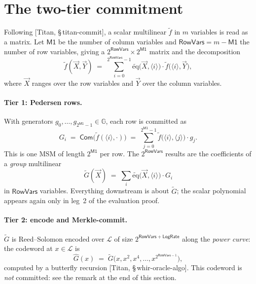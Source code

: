 \documentclass[11pt,a4paper]{article}
\newcommand{\G}{\mathbb{G}}
\newcommand{\dom}{\mathcal{L}}
\newcommand{\bin}[1]{\langle #1 \rangle}
\newcommand{\eq}{\widetilde{\mathrm{eq}}}
\newcommand{\Com}{\mathsf{Com}}
\newcommand{\paper}[1]{\textsf{[Titan, #1]}}
\theoremstyle{definition}
\begin{document}
\section{The two-tier commitment}
\label{sec:commit}

Following \paper{\S\,titan-commit}, a scalar multilinear $\widetilde{f}$ in $m$
variables is read as a matrix. Let $\mathsf{M1}$ be the number of column variables and
$\mathsf{RowVars} = m - \mathsf{M1}$ the number of row variables, giving a
$2^{\mathsf{RowVars}} \times 2^{\mathsf{M1}}$ matrix and the decomposition
\begin{equation}
  \widetilde{f}(\vec X, \vec Y) \;=\; \sum_{i=0}^{2^{\mathsf{RowVars}}-1}
    \eq\bigl(\vec X, \bin{i}\bigr) \cdot \widetilde{f}\bigl(\bin{i}, \vec Y\bigr),
  \label{eq:decompose}
\end{equation}
where $\vec X$ ranges over the row variables and $\vec Y$ over the column variables.

\paragraph{Tier 1: Pedersen rows.}
With generators $g_0, \dots, g_{2^{\mathsf{M1}}-1} \in \G$, each row is committed as
\begin{equation}
  G_i \;=\; \Com\bigl(\widetilde{f}(\bin{i}, \cdot)\bigr)
        \;=\; \sum_{j=0}^{2^{\mathsf{M1}}-1} \widetilde{f}\bigl(\bin{i}, \bin{j}\bigr) \cdot g_j .
  \label{eq:rowcommit}
\end{equation}
This is one MSM of length $2^{\mathsf{M1}}$ per row. The $2^{\mathsf{RowVars}}$ results
are the coefficients of a \emph{group} multilinear
\begin{equation}
  \widetilde{G}(\vec X) \;=\; \sum_i \eq\bigl(\vec X, \bin{i}\bigr) \cdot G_i
  \label{eq:Gmle}
\end{equation}
in $\mathsf{RowVars}$ variables. Everything downstream is about $\widetilde G$; the
scalar polynomial appears again only in leg~2 of the evaluation proof.

\paragraph{Tier 2: encode and Merkle-commit.}
$\widetilde G$ is Reed--Solomon encoded over $\dom$ of size
$2^{\mathsf{RowVars} + \mathsf{LogRate}}$ along the \emph{power curve}: the codeword at
$x \in \dom$ is
\begin{equation}
  \widehat{G}(x) \;=\; \widetilde{G}\bigl(x, x^2, x^4, \dots, x^{2^{\mathsf{RowVars}-1}}\bigr),
  \label{eq:powercurve}
\end{equation}
computed by a butterfly recursion \paper{\S\,whir-oracle-algo}. This codeword is
\emph{not} committed: see the remark at the end of this section.
\end{document}
